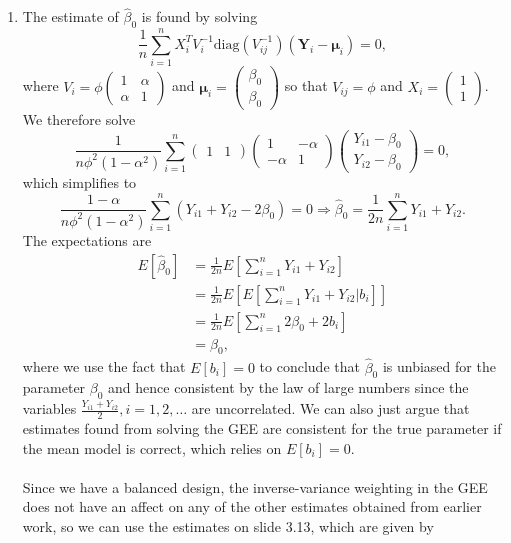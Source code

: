 \documentclass[11pt]{article}
\begin{document}
\begin{enumerate}
	\item The estimate of $\widehat{\beta}_0$ is found by solving
	\[
		\frac{1}{n}\sum_{i=1}^n X_i^T V_i^{-1} \mathrm{diag}(V_{ij}^{-1})(\bm{Y}_i-\bm{\mu}_i) = 0,
	\]
	where $V_i = \phi\begin{pmatrix}
		1 & \alpha \\ \alpha & 1
	\end{pmatrix}$ and $\bm{\mu}_i = \begin{pmatrix}
		\beta_0 \\ \beta_0
	\end{pmatrix}$ so that $V_{ij} = \phi$ and $X_i = \begin{pmatrix}
		1 \\ 1
	\end{pmatrix}$. We therefore solve
	\[
		\frac{1}{n\phi^2(1-\alpha^2)}\sum_{i=1}^n \begin{pmatrix}
			1 & 1
		\end{pmatrix}\begin{pmatrix}
			1 & -\alpha \\ -\alpha & 1
		\end{pmatrix}\begin{pmatrix}
			Y_{i1} - \beta_0 \\ Y_{i2} - \beta_0
		\end{pmatrix} = 0,
	\]
	which simplifies to
	\[
		\frac{1-\alpha}{n\phi^2(1-\alpha^2)}\sum_{i=1}^n (Y_{i1}+Y_{i2}-2\beta_0) = 0\Longrightarrow \widehat{\beta}_0 = \frac{1}{2n}\sum_{i=1}^n Y_{i1} + Y_{i2}. 
	\]
	The expectations are
	\begin{align*}
		E[\widehat{\beta}_0] &= \frac{1}{2n}E\left[\sum_{i=1}^n Y_{i1}+Y_{i2}\right] \\
		&= \frac{1}{2n}E\left[E\left[\sum_{i=1}^n Y_{i1}+Y_{i2} | b_i\right]\right] \\
		&= \frac{1}{2n}E\left[\sum_{i=1}^n 2\beta_0 + 2b_i \right] \\
		&= \beta_0,
	\end{align*}
	where we use the fact that $E[b_i] = 0$ to conclude that $\widehat{\beta}_0$ is unbiased for the parameter $\beta_0$ and hence consistent by the law of large numbers since the variables $\frac{Y_{i1}+Y_{i2}}{2}, i=1,2,\dotsc$ are uncorrelated. We can also just argue that estimates found from solving the GEE are consistent for the true parameter if the mean model is correct, which relies on $E[b_i] = 0$.
	\\ \\ Since we have a balanced design, the inverse-variance weighting in the GEE does not have an affect on any of the other estimates obtained from earlier work, so we can use the estimates on slide 3.13, which are given by

\end{enumerate}
\end{document}

